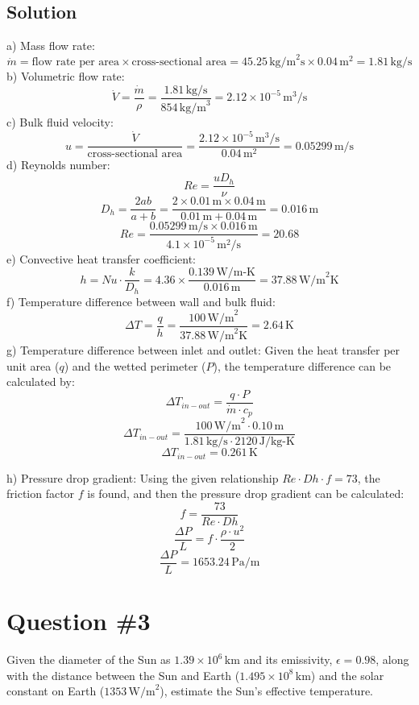 \documentclass[12pt]{article}
\begin{document}
\subsection*{Solution}
a) Mass flow rate:
\[ \dot{m} = \text{flow rate per area} \times \text{cross-sectional area} = 45.25 \, \text{kg/m}^2\text{s} \times 0.04 \, \text{m}^2 = 1.81 \, \text{kg/s} \]
\noindent
b) Volumetric flow rate:
\[ \dot{V} = \frac{\dot{m}}{\rho} = \frac{1.81 \, \text{kg/s}}{854 \, \text{kg/m}^3} = 2.12 \times 10^{-5} \, \text{m}^3/\text{s} \]
\noindent
c) Bulk fluid velocity:
\[ u = \frac{\dot{V}}{\text{cross-sectional area}} = \frac{2.12 \times 10^{-5} \, \text{m}^3/\text{s}}{0.04 \, \text{m}^2} = 0.05299 \, \text{m/s} \]
\noindent
d) Reynolds number:
\[ Re = \frac{uD_h}{\nu} \]
\[ D_h = \frac{2ab}{a+b} = \frac{2 \times 0.01 \, \text{m} \times 0.04 \, \text{m}}{0.01 \, \text{m} + 0.04 \, \text{m}} = 0.016 \, \text{m} \]
\[ Re = \frac{0.05299 \, \text{m/s} \times 0.016 \, \text{m}}{4.1 \times 10^{-5} \, \text{m}^2/\text{s}} = 20.68 \]
\noindent
e) Convective heat transfer coefficient:
\[ h = Nu \cdot \frac{k}{D_h} = 4.36 \times \frac{0.139 \, \text{W/m-K}}{0.016 \, \text{m}} = 37.88 \, \text{W/m}^2\text{K} \]
\noindent
f) Temperature difference between wall and bulk fluid:
\[ \Delta T = \frac{q}{h} = \frac{100 \, \text{W/m}^2}{37.88 \, \text{W/m}^2\text{K}} = 2.64 \, \text{K} \]
\noindent
g) Temperature difference between inlet and outlet:
Given the heat transfer per unit area (\( q \)) and the wetted perimeter (\( P \)), the temperature difference can be calculated by:
\[ \Delta T_{in-out} = \frac{q \cdot P}{\dot{m} \cdot c_p} \]
\[ \Delta T_{in-out} = \frac{100 \, \text{W/m}^2 \cdot 0.10 \, \text{m}}{1.81 \, \text{kg/s} \cdot 2120 \, \text{J/kg-K}} \]
\[ \Delta T_{in-out} = 0.261 \, \text{K} \]

\noindent
h) Pressure drop gradient:
Using the given relationship \( Re \cdot Dh \cdot f = 73 \), the friction factor \( f \) is found, and then the pressure drop gradient can be calculated:
\[ f = \frac{73}{Re \cdot Dh} \]
\[ \frac{\Delta P}{L} = f \cdot \frac{\rho \cdot u^2}{2} \]
\[ \frac{\Delta P}{L} = 1653.24 \, \text{Pa/m} \]

\newpage
\section*{Question \#3}
Given the diameter of the Sun as \(1.39 \times 10^6 \, \text{km}\) and its emissivity, \( \epsilon = 0.98 \), along with the distance between the Sun and Earth (\(1.495 \times 10^8 \, \text{km}\)) and the solar constant on Earth (\(1353 \, \text{W/m}^2\)), estimate the Sun's effective temperature.
\end{document}
